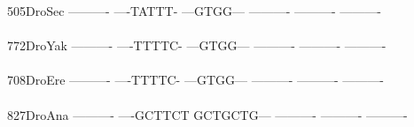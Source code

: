 \documentclass[11pt,twoside,reqno,a4paper]{article}
\begin{document}
{505\hspace*{2\charwidth}DroSec	----------	----TATTT-	---GTGG---	----------	----------	----------	\\
\hspace*{5\charwidth}\hspace*{7\charwidth}\hspace*{1\charwidth}\hspace*{1\charwidth}\hspace*{1\charwidth}\hspace*{1\charwidth}\hspace*{1\charwidth}\hspace*{1\charwidth}\\
772\hspace*{2\charwidth}DroYak	----------	----TTTTC-	---GTGG---	----------	----------	----------	\\
\hspace*{5\charwidth}\hspace*{7\charwidth}\hspace*{1\charwidth}\hspace*{1\charwidth}\hspace*{1\charwidth}\hspace*{1\charwidth}\hspace*{1\charwidth}\hspace*{1\charwidth}\\
708\hspace*{2\charwidth}DroEre	----------	----TTTTC-	---GTGG---	----------	----------	----------	\\
\hspace*{5\charwidth}\hspace*{7\charwidth}\hspace*{1\charwidth}\hspace*{1\charwidth}\hspace*{1\charwidth}\hspace*{1\charwidth}\hspace*{1\charwidth}\hspace*{1\charwidth}\\
827\hspace*{2\charwidth}DroAna	----------	----GCTTCT	GCTGCTG---	----------	----------	----------	\\
\hspace*{5\charwidth}\hspace*{7\charwidth}\hspace*{1\charwidth}\hspace*{1\charwidth}\hspace*{1\charwidth}\hspace*{1\charwidth}\hspace*{1\charwidth}\hspace*{1\charwidth}\\
}
\end{document}
